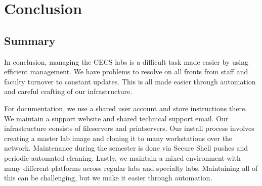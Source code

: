 \chapter{Conclusion} \label{ch:conclusion}
\section{Summary} \label{sec:summary}
In conclusion, managing the CECS labs is a difficult task made easier by using efficient management. We have problems to resolve on all fronts from staff and faculty turnover to constant updates. This is all made easier through automation and careful crafting of our infrastructure.  

For documentation, we use a shared user account and store instructions there.  We maintain a support website and shared technical support email.  Our infrastructure consists of fileservers and printservers.  Our install process involves creating a master lab image and cloning it to many workstations over the network.  Maintenance during the semester is done via Secure Shell pushes and periodic automated cleaning.  Lastly, we maintain a mixed environment with many different platforms across regular labs and specialty labs.  Maintaining all of this can be challenging, but we make it easier through automation. 


